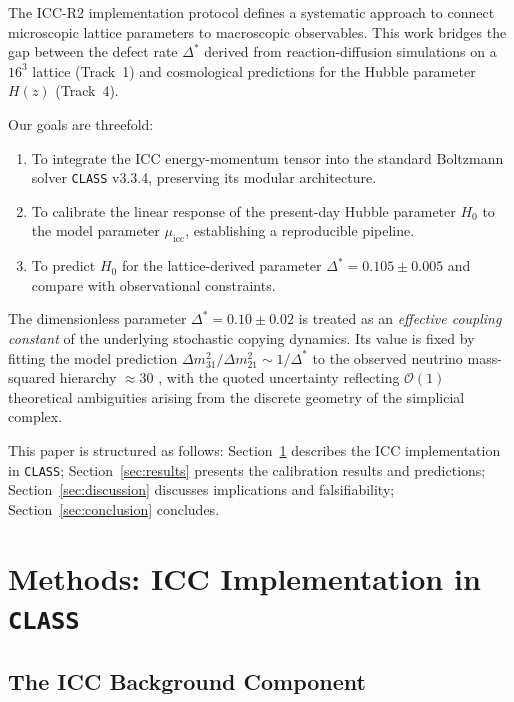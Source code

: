 \documentclass[11pt,a4paper]{article}
\newcommand{\DeltaStar}{\Delta^{\ast}}
\newcommand{\muicc}{\mu_{\mathrm{icc}}}
\newcommand{\class}{\texttt{CLASS}}
\begin{document}
The ICC-R2 implementation protocol \cite{gimranov2026roadmap} defines a systematic approach to connect microscopic lattice parameters to macroscopic observables. This work bridges the gap between the defect rate $\DeltaStar$ derived from reaction-diffusion simulations on a $16^3$ lattice (Track~1) and cosmological predictions for the Hubble parameter $H(z)$ (Track~4).

Our goals are threefold:
\begin{enumerate}[label=\arabic*.]
    \item To integrate the ICC energy-momentum tensor into the standard Boltzmann solver \class{} v3.3.4, preserving its modular architecture.
    \item To calibrate the linear response of the present-day Hubble parameter $H_0$ to the model parameter $\muicc$, establishing a reproducible pipeline.
    \item To predict $H_0$ for the lattice-derived parameter $\DeltaStar = 0.105 \pm 0.005$ and compare with observational constraints.
\end{enumerate}

The dimensionless parameter $\DeltaStar = 0.10 \pm 0.02$ is treated as an \emph{effective coupling constant} of the underlying stochastic copying dynamics. Its value is fixed by fitting the model prediction $\Delta m^2_{31}/\Delta m^2_{21} \sim 1/\DeltaStar$ to the observed neutrino mass-squared hierarchy $\approx 30$ \cite{nufit2024}, with the quoted uncertainty reflecting $\mathcal{O}(1)$ theoretical ambiguities arising from the discrete geometry of the simplicial complex.

This paper is structured as follows: Section~\ref{sec:methods} describes the ICC implementation in \class{}; Section~\ref{sec:results} presents the calibration results and predictions; Section~\ref{sec:discussion} discusses implications and falsifiability; Section~\ref{sec:conclusion} concludes.

\section{Methods: ICC Implementation in \class{}}
\label{sec:methods}

\subsection{The ICC Background Component}
\label{subsec:icc_component}
\end{document}
